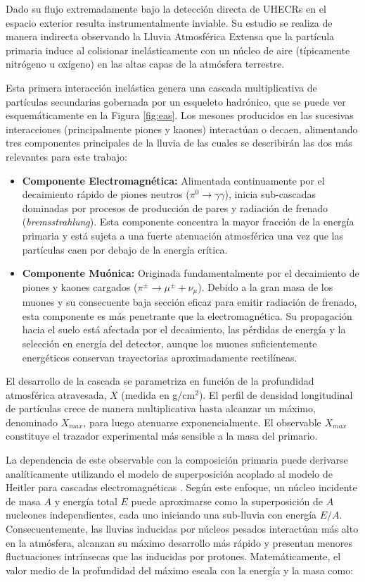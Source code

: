 Dado su flujo extremadamente bajo la detección directa de UHECRs en el espacio exterior resulta instrumentalmente inviable. Su estudio se realiza de manera indirecta observando la Lluvia Atmosférica Extensa que la partícula primaria induce al colisionar inelásticamente con un núcleo de aire (típicamente nitrógeno u oxígeno) en las altas capas de la atmósfera terrestre.

Esta primera interacción inelástica genera una cascada multiplicativa de partículas secundarias gobernada por un esqueleto hadrónico, que se puede ver esquemáticamente en la Figura \ref{fig:eas}. Los mesones producidos en las sucesivas interacciones (principalmente piones y kaones) interactúan o decaen, alimentando tres componentes principales de la lluvia de las cuales se describirán las dos más relevantes para este trabajo:

\begin{itemize}
	\item \textbf{Componente Electromagnética:} Alimentada continuamente por el decaimiento rápido de piones neutros ($\pi^0 \to \gamma\gamma$), inicia sub-cascadas dominadas por procesos de producción de pares y radiación de frenado (\textit{bremsstrahlung}). Esta componente concentra la mayor fracción de la energía primaria y está sujeta a una fuerte atenuación atmosférica una vez que las partículas caen por debajo de la energía crítica.
	
	\item \textbf{Componente Muónica:} Originada fundamentalmente por el decaimiento de piones y kaones cargados ($\pi^\pm \to \mu^\pm + \nu_\mu$). Debido a la gran masa de los muones y su consecuente baja sección eficaz para emitir radiación de frenado, esta componente es más penetrante que la electromagnética. Su propagación hacia el suelo está afectada por el decaimiento, las pérdidas de energía y la selección en energía del detector, aunque los muones suficientemente energéticos conservan trayectorias aproximadamente rectilíneas.
\end{itemize}

El desarrollo de la cascada se parametriza en función de la profundidad atmosférica atravesada, $X$ (medida en g/cm$^2$). El perfil de densidad longitudinal de partículas crece de manera multiplicativa hasta alcanzar un máximo, denominado $X_{max}$, para luego atenuarse exponencialmente. El observable $X_{max}$ constituye el trazador experimental más sensible a la masa del primario.

La dependencia de este observable con la composición primaria puede derivarse analíticamente utilizando el modelo de superposición acoplado al modelo de Heitler para cascadas electromagnéticas \cite{matthews2005}. Según este enfoque, un núcleo incidente de masa $A$ y energía total $E$ puede aproximarse como la superposición de $A$ nucleones independientes, cada uno iniciando una sub-lluvia con energía $E/A$. Consecuentemente, las lluvias inducidas por núcleos pesados interactúan más alto en la atmósfera, alcanzan su máximo desarrollo más rápido y presentan menores fluctuaciones intrínsecas que las inducidas por protones. Matemáticamente, el valor medio de la profundidad del máximo escala con la energía y la masa como:


